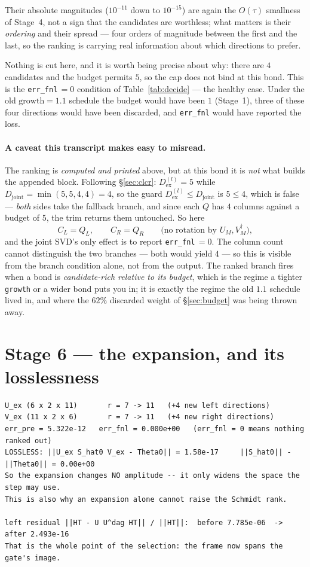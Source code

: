 \documentclass[11pt,a4paper]{article}
\newcommand{\Dex}{D_{\mathrm{ex}}}
\newcommand{\Djoint}{D_{\mathrm{joint}}}
\newcommand{\code}[1]{\texttt{\small #1}}
\begin{document}
Their absolute magnitudes ($10^{-11}$ down to $10^{-15}$) are again the $O(\tau)$ smallness of
Stage~4, not a sign that the candidates are worthless; what matters is their \emph{ordering} and
their spread --- four orders of magnitude between the first and the last, so the ranking is
carrying real information about which directions to prefer.

Nothing is cut here, and it is worth being precise about why: there are $4$ candidates and the
budget permits $5$, so the cap does not bind at this bond. This is the \code{err\_fnl}$\,=0$
condition of Table~\ref{tab:decide} --- the healthy case. Under the old $\text{growth} = 1.1$
schedule the budget would have been $1$ (Stage~1), three of these four directions would have been
discarded, and \code{err\_fnl} would have reported the loss.

\paragraph{A caveat this transcript makes easy to misread.} The ranking is \emph{computed and
printed} above, but at this bond it is \emph{not} what builds the appended block. Following
\S\ref{sec:clcr}: $\Dex^{(l)} = 5$ while $\Djoint = \min(5,5,4,4) = 4$, so the guard
$\Dex^{(l)} \le \Djoint$ is $5 \le 4$, which is false --- \emph{both} sides take the fallback
branch, and since each $Q$ has $4$ columns against a budget of $5$, the trim returns them
untouched. So here
\begin{equation}
  C_L = Q_L, \qquad C_R = Q_R \qquad\text{(no rotation by } U_M, V_M^\dagger\text{)},
\end{equation}
and the joint SVD's only effect is to report \code{err\_fnl}$\,=0$. The column count cannot
distinguish the two branches --- both would yield $4$ --- so this is visible from the branch
condition alone, not from the output. The ranked branch fires when a bond is
\emph{candidate-rich relative to its budget}, which is the regime a tighter \code{growth} or a
wider bond puts you in; it is exactly the regime the old $1.1$ schedule lived in, and where the
$62\%$ discarded weight of \S\ref{sec:budget} was being thrown away.

\section{Stage 6 --- the expansion, and its losslessness}

\begin{lstlisting}
U_ex (6 x 2 x 11)       r = 7 -> 11   (+4 new left directions)
V_ex (11 x 2 x 6)       r = 7 -> 11   (+4 new right directions)
err_pre = 5.322e-12   err_fnl = 0.000e+00   (err_fnl = 0 means nothing ranked out)
LOSSLESS: ||U_ex S_hat0 V_ex - Theta0|| = 1.58e-17     ||S_hat0|| - ||Theta0|| = 0.00e+00
So the expansion changes NO amplitude -- it only widens the space the step may use.
This is also why an expansion alone cannot raise the Schmidt rank.

left residual ||HT - U U^dag HT|| / ||HT||:  before 7.785e-06  ->  after 2.493e-16
That is the whole point of the selection: the frame now spans the gate's image.
\end{lstlisting}
\end{document}
